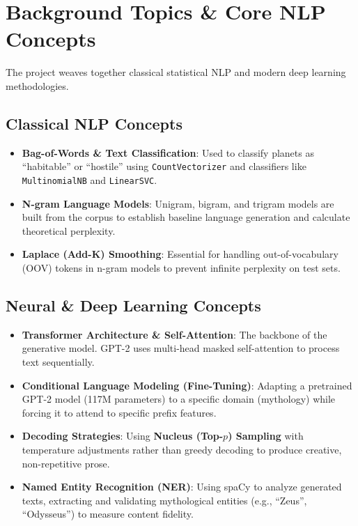 \documentclass[12pt,a4paper]{report}
\begin{document}
\chapter{Background Topics \& Core NLP Concepts}
The project weaves together classical statistical NLP and modern deep learning methodologies.

\section{Classical NLP Concepts}
\begin{itemize}
    \item \textbf{Bag-of-Words \& Text Classification}: Used to classify planets as ``habitable'' or ``hostile'' using \texttt{CountVectorizer} and classifiers like \texttt{MultinomialNB} and \texttt{LinearSVC}.
    \item \textbf{N-gram Language Models}: Unigram, bigram, and trigram models are built from the corpus to establish baseline language generation and calculate theoretical perplexity.
    \item \textbf{Laplace (Add-K) Smoothing}: Essential for handling out-of-vocabulary (OOV) tokens in n-gram models to prevent infinite perplexity on test sets.
\end{itemize}

\section{Neural \& Deep Learning Concepts}
\begin{itemize}
    \item \textbf{Transformer Architecture \& Self-Attention}: The backbone of the generative model. GPT-2 uses multi-head masked self-attention to process text sequentially.
    \item \textbf{Conditional Language Modeling (Fine-Tuning)}: Adapting a pretrained GPT-2 model (117M parameters) to a specific domain (mythology) while forcing it to attend to specific prefix features.
    \item \textbf{Decoding Strategies}: Using \textbf{Nucleus (Top-$p$) Sampling} with temperature adjustments rather than greedy decoding to produce creative, non-repetitive prose.
    \item \textbf{Named Entity Recognition (NER)}: Using spaCy to analyze generated texts, extracting and validating mythological entities (e.g., ``Zeus'', ``Odysseus'') to measure content fidelity.
\end{itemize}
\end{document}
